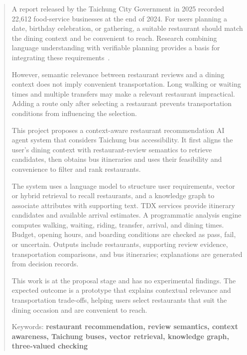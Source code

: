 
\begin{abstract}
A report released by the Taichung City Government in 2025 recorded 22,612 food-service businesses at the end of 2024. For users planning a date, birthday celebration, or gathering, a suitable restaurant should match the dining context and be convenient to reach. Research combining language understanding with verifiable planning provides a basis for integrating these requirements~\cite{taichung_eat_outside,llm_planning_tools}.

However, semantic relevance between restaurant reviews and a dining context does not imply convenient transportation. Long walking or waiting times and multiple transfers may make a relevant restaurant impractical. Adding a route only after selecting a restaurant prevents transportation conditions from influencing the selection.

This project proposes a context-aware restaurant recommendation AI agent system that considers Taichung bus accessibility. It first aligns the user's dining context with restaurant-review semantics to retrieve candidates, then obtains bus itineraries and uses their feasibility and convenience to filter and rank restaurants.

The system uses a language model to structure user requirements, vector or hybrid retrieval to recall restaurants, and a knowledge graph to associate attributes with supporting text. TDX services provide itinerary candidates and available arrival estimates. A programmatic analysis engine computes walking, waiting, riding, transfer, arrival, and dining times. Budget, opening hours, and boarding conditions are checked as pass, fail, or uncertain. Outputs include restaurants, supporting review evidence, transportation comparisons, and bus itineraries; explanations are generated from decision records.

This work is at the proposal stage and has no experimental findings. The expected outcome is a prototype that explains contextual relevance and transportation trade-offs, helping users select restaurants that suit the dining occasion and are convenient to reach.
\begin{flushleft}
Keywords: \textbf{restaurant recommendation, review semantics, context awareness, Taichung buses, vector retrieval, knowledge graph, three-valued checking}
\end{flushleft}
\end{abstract}
